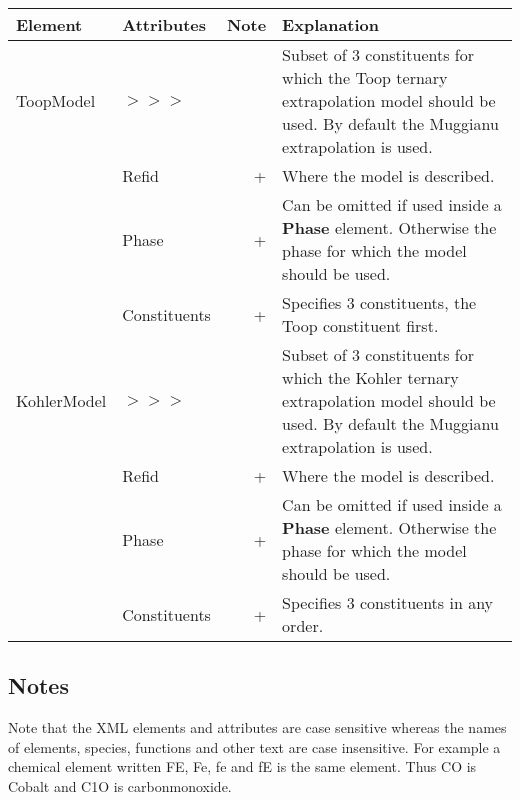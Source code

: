 \documentclass{article}
\begin{document}
\bigskip
\begin{tabular}{|p{} p{} r p{}|}\hline
  Element & Attributes & Note & Explanation\\\hline

  ToopModel &$>>>$& & Subset of 3 constituents for which the Toop ternary extrapolation model should be used.    By default the Muggianu extrapolation is used.\\
      & Refid & + & Where the model is described.\\
      & Phase & + & Can be omitted if used inside a {\bf Phase} element.  Otherwise the phase for which the model should be used.\\
      & Constituents & + & Specifies 3 constituents, the Toop constituent first.\\\hline

  KohlerModel &$>>>$&  & Subset of 3 constituents for which the Kohler ternary extrapolation model should be used.  By default the Muggianu extrapolation is used.\\
      & Refid & + & Where the model is described.\\
      & Phase & + & Can be omitted if used inside a {\bf Phase} element.  Otherwise the phase for which the model should be used.\\
      & Constituents & + & Specifies 3 constituents in any order.\\\hline

\end{tabular}

\subsection{Notes}\label{sec:notes}

Note that the XML elements and attributes are case sensitive whereas
the names of elements, species, functions and other text are case
insensitive.  For example a chemical element written FE, Fe, fe and fE
is the same element.  Thus CO is Cobalt and C1O is carbonmonoxide.
\end{document}
